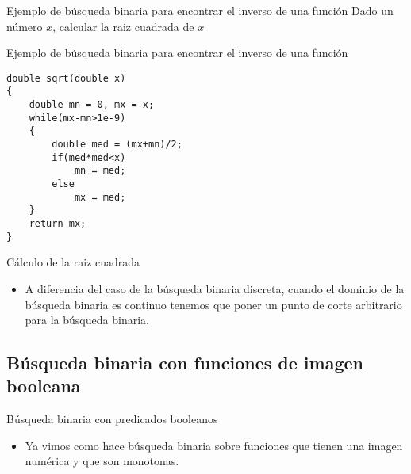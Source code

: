 \documentclass[compress]{beamer}
\begin{document}
\begin{frame}{Ejemplo de b\'usqueda binaria para encontrar el inverso de una funci\'on}
Dado un n\'umero $x$, calcular la raiz cuadrada de $x$
\end{frame}

\begin{frame}[fragile]{Ejemplo de b\'usqueda binaria para encontrar el inverso de una funci\'on}
\begin{lstlisting}
double sqrt(double x)
{
    double mn = 0, mx = x;
    while(mx-mn>1e-9)
    {
        double med = (mx+mn)/2;
        if(med*med<x)
            mn = med;
        else
            mx = med;
    }
    return mx;
}
\end{lstlisting}
\end{frame}

\begin{frame}{C\'alculo de la raiz cuadrada}
\begin{itemize}
\item A diferencia del caso de la b\'usqueda binaria discreta, cuando el dominio de la b\'usqueda binaria es continuo tenemos que poner un punto de corte arbitrario para la b\'usqueda binaria.
\pause
{}
\pause
{}
\end{itemize}
\end{frame}

\subsection{B\'usqueda binaria con funciones de imagen booleana}

\begin{frame}{B\'usqueda binaria con predicados booleanos}
\begin{itemize}
\item Ya vimos como hace b\'usqueda binaria sobre funciones que tienen una imagen num\'erica y que son monotonas.
\pause
{}
\pause
{}
\end{itemize}
\end{frame}
\end{document}
